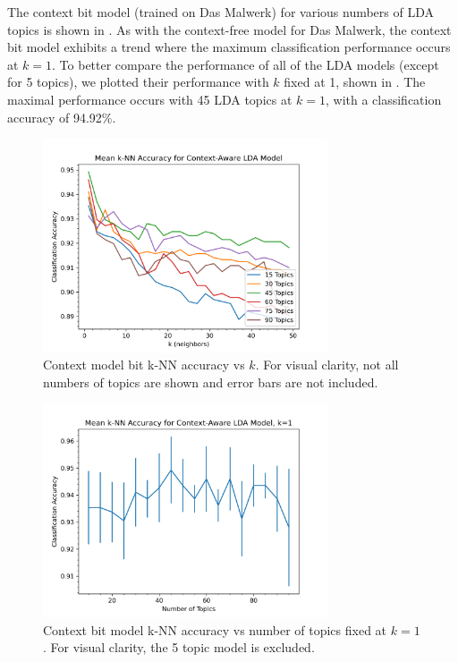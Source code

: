 \documentclass[../stegner_thesis.tex]{subfiles}
\begin{document}
\par The context bit model (trained on Das Malwerk) for various numbers of LDA
topics is shown in .
As with the context-free model for Das Malwerk, the context bit model exhibits
a trend where the maximum classification performance occurs at $k=1$.
To better compare the performance of all of the LDA models (except for 5
topics), we plotted their performance with $k$ fixed at 1, shown in
.
The maximal performance occurs with 45 LDA topics at $k=1$, with a
classification accuracy of 94.92\%.

\begin{figure}[p]
	\centering
	\includegraphics[width=0.75\textwidth]{img/win32/knn_lda_context.png}
	\caption[Context bit model k-NN accuracy vs $k$]{%
		Context model bit k-NN accuracy vs $k$.
		For visual clarity, not all numbers of topics are shown and error bars are
		not included.
	}%
	\label{fig:context_bit_topic}
\end{figure}
\begin{figure}[p]
	\centering
	\includegraphics[width=0.75\textwidth]{img/win32/knn_lda_context_k_01.png}
	\caption[Context bit model k-NN accuracy vs number of topics]{%
		Context bit model k-NN accuracy vs number of topics fixed at $k=1$.
		For visual clarity, the 5 topic model is excluded.
	}%
	\label{fig:context_bit_k1}
\end{figure}
\end{document}
